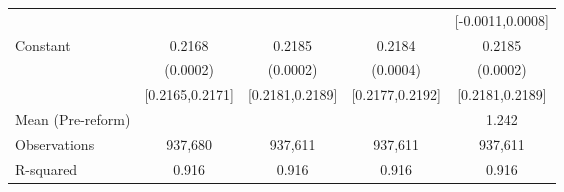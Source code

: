 {\begin{tabular}{l*{4}{c}}
                    &                     &                     &                     &[-0.0011,0.0008]         \\
Constant            &      0.2168\sym{***}&      0.2185\sym{***}&      0.2184\sym{***}&      0.2185\sym{***}\\
                    &    (0.0002)         &    (0.0002)         &    (0.0004)         &    (0.0002)         \\
                    &[0.2165,0.2171]         &[0.2181,0.2189]         &[0.2177,0.2192]         &[0.2181,0.2189]         \\
\midrule
Mean (Pre-reform)   &                     &                     &                     &       1.242         \\
Observations        &     937,680         &     937,611         &     937,611         &     937,611         \\
R-squared           &       0.916         &       0.916         &       0.916         &       0.916         \\
\bottomrule
\end{tabular}
}

